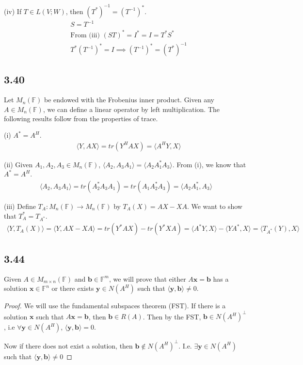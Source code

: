 \documentclass{article}
\newcommand{\inprod}[1]{\langle #1 \rangle}
\begin{document}
	(iv) If $T \in L(V;W)$, then $(T^*)^{-1} = (T^{-1})^*$.
	\begin{align*}
	&S = T^{-1} \\
	&\text{From (iii) } (ST)^* = I^* = I = T^* S^* \\
	&T^* (T^{-1})^* = I \implies (T^{-1})^* = (T^*)^{-1}
	\end{align*}
	
	\subsection*{3.40}
	Let $M_n(\mathbb{F})$ be endowed with the Frobenius inner product. Given any $A \in M_n(\mathbb{F})$, we can define a linear operator by left multiplication. The following results follow from the properties of trace.
	
	(i) $A^* = A^H$.
	\begin{align*}
	&\inprod{Y, AX} = tr(Y^H A X) = \inprod{A^H Y, X}
	\end{align*}
	
	(ii) Given $A_1, A_2, A_3 \in M_n(\mathbb{F})$, $\inprod{A_2, A_3A_1} = \inprod{A_2 A_1^* A_3}$. From (i), we know that $A^* = A^H$.
	\begin{align*}
	\inprod{A_2, A_3A_1} = tr(A_2^*A_3 A_1) = tr(A_1 A_2^* A_3) = \inprod{A_2 A_1^*, A_3}
	\end{align*}
	
	(iii) Define $T_A : M_n(\mathbb{F}) \to M_n(\mathbb{F})$ by $T_A(X) = AX - XA$. We want to show that $T_A^* = T_{A^*}$.
	\begin{align*}
	\inprod{Y, T_A(X)} = \inprod{Y, AX - XA} = tr(Y^*AX) - tr(Y^* XA) = \inprod{A^*Y, X} - \inprod{YA^*, X} = \inprod{T_{A^*}(Y), X}
	\end{align*}
	
	\subsection*{3.44}
	Given $A \in M_{m\times n }(\mathbb{F})$ and $\mathbf{b} \in \mathbb{F}^m$, we will prove that either $A \mathbf{x} = \mathbf{b}$ has a solution $\mathbf{x} \in \mathbb{F}^n$ or there exists $\mathbf{y} \in N(A^H)$ such that $\inprod{\mathbf{y}, \mathbf{b}} \neq 0$.
	
	\begin{proof}
		We will use the fundamental subspaces theorem (FST). If there is a solution $\mathbf{x}$ such that $A \mathbf{x} = \mathbf{b}$, then $\mathbf{b} \in R(A)$. Then by the FST, $\mathbf{b} \in N(A^H)^{\perp}$, i.e $\forall \mathbf{y} \in N(A^H)$, $\inprod{\mathbf{y},\mathbf{b}} = 0$. 
		
		Now if there does not exist a solution, then $\mathbf{b} \notin N(A^H)^{\perp}$. I.e. $\exists \mathbf{y} \in N(A^H)$ such that $\inprod{\mathbf{y} ,\mathbf{b}} \neq 0$
	\end{proof}
	
\end{document}
